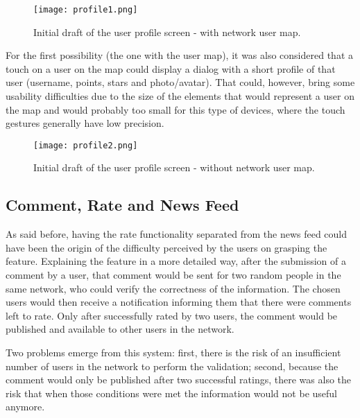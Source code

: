 \begin{figure}[h!]
  \begin{center}
    \leavevmode
    \texttt{[image: profile1.png]}
    \caption{Initial draft of the user profile screen - with network user map.}
    \label{fig:profile1}
  \end{center}
\end{figure}

For the first possibility (the one with the user map), it was also considered that a touch on a user on the map could display a dialog with a short profile of that user (username, points, stars and photo/avatar). That could, however, bring some usability difficulties due to the size of the elements that would represent a user on the map and would probably too small for this type of devices, where the touch gestures generally have low precision.

\begin{figure}[h!]
  \begin{center}
    \leavevmode
    \texttt{[image: profile2.png]}
    \caption{Initial draft of the user profile screen - without network user map.}
    \label{fig:profile2}
  \end{center}
\end{figure}

\subsection{Comment, Rate and News Feed}

As said before, having the rate functionality separated from the news feed could have been the origin of the difficulty perceived by the users on grasping the feature. Explaining the feature in a more detailed way, after the submission of a comment by a user, that comment would be sent for two random people in the same network, who could verify the correctness of the information. 
The chosen users would then receive a notification informing them that there were comments left to rate. Only after successfully rated by two users, the comment would be published and available to other users in the network.

Two problems emerge from this system: first, there is the risk of an insufficient number of users in the network to perform the validation; second, because the comment would only be published after two successful ratings, there was also the risk that when those conditions were met the information would not be useful anymore.

